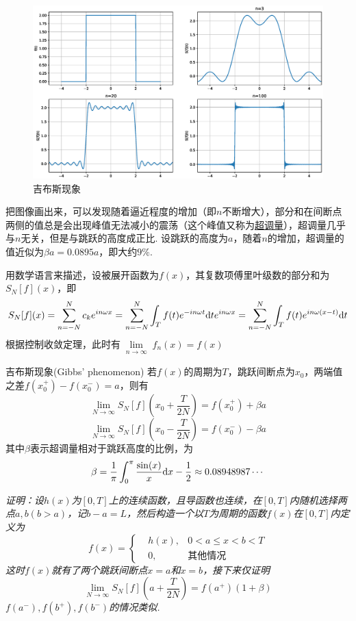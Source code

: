 \documentclass[main.tex]{subfiles}
\begin{document}
\begin{figure}[hbtp]
    \centering
    \includegraphics[width=\textwidth]{gibbs2.eps}
    \caption{吉布斯现象}
\end{figure}

把图像画出来，可以发现随着逼近程度的增加（即\(n\)不断增大），部分和在间断点两侧的值总是会出现峰值无法减小的震荡（这个峰值又称为\uline{超调量}），超调量几乎与\(n\)无关，但是与跳跃的高度成正比. 设跳跃的高度为\(a\)，随着\(n\)的增加，超调量的值近似为\(\beta a=0.0895a\)，即大约\(9\%\).

用数学语言来描述，设被展开函数为\(f(x)\)，其复数项傅里叶级数的部分和为\(S_N[f](x)\)，即
\[ S_N[f](x) = \sum_{n=-N}^{N} c_ke^{in\omega x} = \sum_{n=-N}^{N}\int_T f(t)e^{-in\omega t}{\rm d}t e^{in\omega x} = \sum_{n=-N}^{N}\int_Tf(t)e^{in\omega(x-t)}{\rm d}t \]
根据控制收敛定理，此时有\(\lim \limits_{\substack{n \to \infty}}f_n(x)=f(x)\)
\begin{theorem}{吉布斯现象(Gibbs' phenomenon)}
    若\(f(x)\)的周期为\(T\)，跳跃间断点为\(x_0\)，两端值之差\(f(x_0^+)-f(x_0^-)=a\)，则有
    \[\lim_{N \to \infty} S_N[f]\left(x_0+\frac{T}{2N}\right)=f(x_0^+)+\beta a\]
    \[\lim_{N \to \infty} S_N[f]\left(x_0-\frac{T}{2N}\right)=f(x_0^-)-\beta a\]
    其中\(\beta\)表示超调量相对于跳跃高度的比例，为
    \[\beta=\frac{1}{\pi}\int_{0}^{\pi}\frac{\sin(x)}{x}{\rm d}x-\frac{1}{2} \approx 0.08948987 \cdots\]
\end{theorem}
\textit{
    证明：设\(h(x)\)为\([0,T]\)上的连续函数，且导函数也连续，在\([0,T]\)内随机选择两点\(a,b(b>a)\)，记\(b-a=L\)，然后构造一个以\(T\)为周期的函数\(f(x)\)在\([0,T]\)内定义为
    \[f(x)=\left\{\begin{aligned} & h(x), & 0 < a \leq x < b < T \\ & 0, & \mbox{其他情况} \end{aligned}\right.\]
    这时\(f(x)\)就有了两个跳跃间断点\(x=a\)和\(x=b\)，接下来仅证明
    \[\lim_{N\to \infty} S_N[f](a+\frac{T}{2N})=f(a^+)(1+\beta)\]
    \(f(a^-),f(b^+),f(b^-)\)的情况类似.
}
\end{document}
